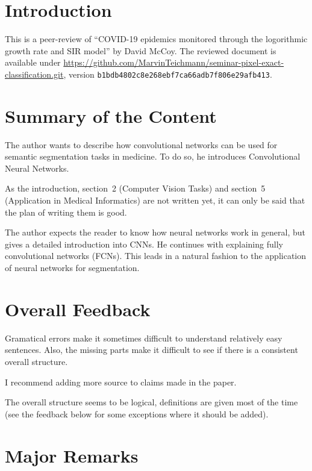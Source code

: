 \documentclass[a4paper,9pt]{scrartcl}
\title{\titletext}
\author{Martin Thoma}
\begin{document}
\maketitle
\section{Introduction}
This is a peer-review of \enquote{COVID-19 epidemics monitored through the logorithmic growth rate and SIR model} 
by David McCoy. The reviewed document
is available under \href{https://github.com/MarvinTeichmann/seminar-pixel-exact-classification.git}{https://github.com/MarvinTeichmann/seminar-pixel-exact-classification.git}, version
\texttt{b1bdb4802c8e268ebf7ca66adb7f806e29afb413}.

\section{Summary of the Content}
The author wants to describe how convolutional networks can be used for
semantic segmentation tasks in medicine. To do so, he introduces Convolutional
Neural Networks.

As the introduction, section~2 (Computer Vision Tasks) and section~5
(Application in Medical Informatics) are not written yet, it can only be said
that the plan of writing them is good.

The author expects the reader to know how neural networks work in general, but
gives a detailed introduction into CNNs. He continues with explaining fully
convolutional networks (FCNs). This leads in a natural fashion to the
application of neural networks for segmentation.


\section{Overall Feedback}
Gramatical errors make it sometimes difficult to understand relatively easy
sentences. Also, the missing parts make it difficult to see if there is a
consistent overall structure.

I recommend adding more source to claims made in the paper.

The overall structure seems to be logical, definitions are given most of the
time (see the feedback below for some exceptions where it should be added).


\section{Major Remarks}
\end{document}
